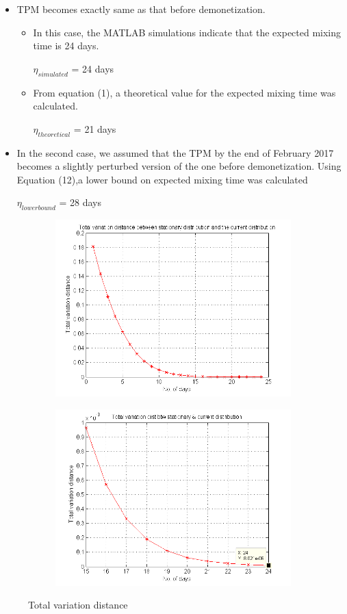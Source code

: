 \documentclass[12pt]{article}
\begin{document}
\begin{itemize}
\item TPM becomes exactly same as that before demonetization.
\begin{itemize}
\item In this case, the MATLAB simulations indicate that the expected mixing time is 24 days.
\begin{center}
$\eta_{simulated}$ = 24 days
\end{center}
\item From equation (1), a theoretical value for the expected mixing time was calculated.
\begin{center}
$\eta_{theoretical}$ = 21 days
\end{center}


\end{itemize}
\item In the second case, we assumed that the TPM by the end of February 2017 becomes a slightly perturbed version of the one before demonetization. Using Equation (12),a lower bound on expected mixing time was calculated
\begin{center}
$\eta_{lower bound}$ = 28 days
\end{center}
\end{itemize}
\begin{figure}[H]
\centering
\begin{subfigure}
  \centering
  \includegraphics[width=.4\linewidth]{TVD1.png}
\end{subfigure}
\begin{subfigure}
  \centering
  \includegraphics[width=.4\linewidth]{TVD2.png}
\end{subfigure}
\caption{Total variation distance}
\label{fig:test}
\end{figure}
\end{document}
